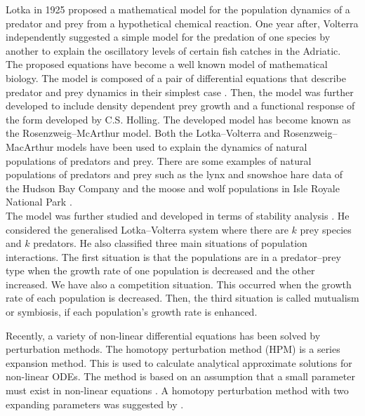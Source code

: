 \documentclass[a4paper,12pt]{article}
\begin{document}
Lotka in 1925 proposed a mathematical model for the population dynamics of a predator and prey from a hypothetical chemical reaction. One year after, Volterra independently suggested a simple model for the predation of one species by another to explain the oscillatory levels of certain fish catches in the Adriatic.
 The proposed equations have become a well known model of mathematical biology. The model is composed of a pair of differential equations that describe predator and prey dynamics in their simplest case \cite{lotka1925}. Then, the model was further developed to include density dependent prey growth and a functional response of the form developed by C.S. Holling. The developed model has become known as the Rosenzweig--McArthur model. Both the Lotka--Volterra and Rosenzweig--MacArthur models have been used to explain the dynamics of natural populations of predators and prey. There are some examples of natural populations of predators and prey such as the lynx and snowshoe hare data of the Hudson Bay Company and the moose and wolf populations in Isle Royale National Park \cite{ Gilpin1973, Goel1971, Jost2005}.\\  

The model was further studied and developed in terms of stability analysis \cite{Murray2002}. He considered the generalised Lotka--Volterra system where there are $k$ prey species and $k$ predators. He also classified three main situations of population interactions. The first situation is that the populations are in a predator--prey type when the growth rate of one population is decreased and the other increased. We have also a competition situation. This occurred when the growth rate of each population is decreased. Then, the third situation is called mutualism or symbiosis, if each population's growth rate is enhanced. 

  
Recently, a variety of non-linear differential equations has been solved by perturbation methods. The homotopy perturbation method (HPM) is a series expansion method. This is used to calculate analytical approximate solutions for non-linear ODEs. The method is based on an assumption that a small parameter must exist in non-linear equations \cite{He2000,He1999,He2003,Chowdhury,Vogt}. A homotopy perturbation method with two expanding parameters was suggested by \cite{He2014}.\\
  
\end{document}
